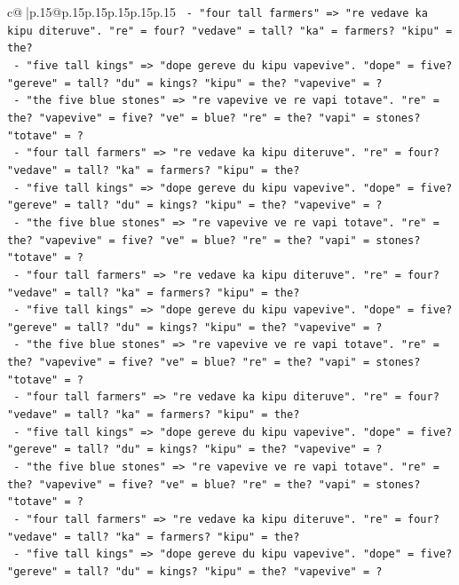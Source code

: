 \documentclass{article}
\begin{document}
{\begin{supertabular}{c@{$\;$}|p{.15\linewidth}@{}p{.15\linewidth}p{.15\linewidth}p{.15\linewidth}p{.15\linewidth}p{.15\linewidth}}
{{{\texttt{    {-} "four tall farmers" => "re vedave ka kipu diteruve". "re" = four? "vedave" = tall? "ka" = farmers? "kipu" = the?} \\
\texttt{    {-} "five tall kings" => "dope gereve du kipu vapevive". "dope" = five? "gereve" = tall? "du" = kings? "kipu" = the? "vapevive" = ?} \\
\texttt{    {-} "the five blue stones" => "re vapevive ve re vapi totave". "re" = the? "vapevive" = five? "ve" = blue? "re" = the? "vapi" = stones? "totave" = ?} \\
\texttt{    {-} "four tall farmers" => "re vedave ka kipu diteruve". "re" = four? "vedave" = tall? "ka" = farmers? "kipu" = the?} \\
\texttt{    {-} "five tall kings" => "dope gereve du kipu vapevive". "dope" = five? "gereve" = tall? "du" = kings? "kipu" = the? "vapevive" = ?} \\
\texttt{    {-} "the five blue stones" => "re vapevive ve re vapi totave". "re" = the? "vapevive" = five? "ve" = blue? "re" = the? "vapi" = stones? "totave" = ?} \\
\texttt{    {-} "four tall farmers" => "re vedave ka kipu diteruve". "re" = four? "vedave" = tall? "ka" = farmers? "kipu" = the?} \\
\texttt{    {-} "five tall kings" => "dope gereve du kipu vapevive". "dope" = five? "gereve" = tall? "du" = kings? "kipu" = the? "vapevive" = ?} \\
\texttt{    {-} "the five blue stones" => "re vapevive ve re vapi totave". "re" = the? "vapevive" = five? "ve" = blue? "re" = the? "vapi" = stones? "totave" = ?} \\
\texttt{    {-} "four tall farmers" => "re vedave ka kipu diteruve". "re" = four? "vedave" = tall? "ka" = farmers? "kipu" = the?} \\
\texttt{    {-} "five tall kings" => "dope gereve du kipu vapevive". "dope" = five? "gereve" = tall? "du" = kings? "kipu" = the? "vapevive" = ?} \\
\texttt{    {-} "the five blue stones" => "re vapevive ve re vapi totave". "re" = the? "vapevive" = five? "ve" = blue? "re" = the? "vapi" = stones? "totave" = ?} \\
\texttt{    {-} "four tall farmers" => "re vedave ka kipu diteruve". "re" = four? "vedave" = tall? "ka" = farmers? "kipu" = the?} \\
\texttt{    {-} "five tall kings" => "dope gereve du kipu vapevive". "dope" = five? "gereve" = tall? "du" = kings? "kipu" = the? "vapevive" = ?} \\
}}}
\end{supertabular}}
\end{document}
